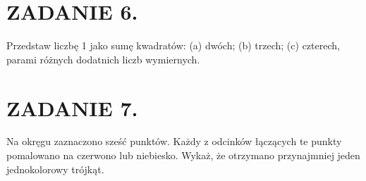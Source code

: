 \documentclass[10pt]{article}
\begin{document}
\section*{ZADANIE 6.}
Przedstaw liczbę 1 jako sumę kwadratów: (a) dwóch; (b) trzech; (c) czterech, parami różnych dodatnich liczb wymiernych.

\section*{ZADANIE 7.}
Na okręgu zaznaczono sześć punktów. Każdy z odcinków łączących te punkty pomalowano na czerwono lub niebiesko. Wykaż, że otrzymano przynajmniej jeden jednokolorowy trójkąt.
\end{document}
